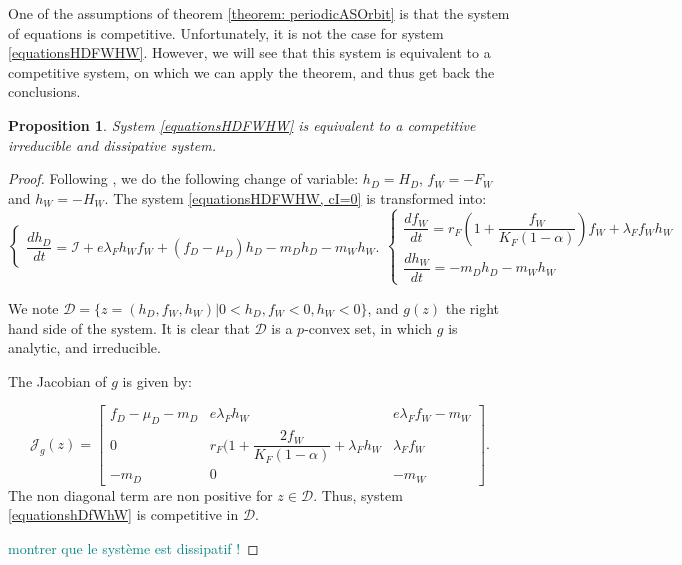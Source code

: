 \documentclass{article}
\newcommand{\lfw}{\lambda_{F}}
\newcommand{\lfw}{\lambda_{F}}
\newcommand{\cI}{\mathcal{I}}
\newcommand{\marc}[1]{\textcolor{teal}{#1}}
\newtheorem{prop}{Proposition}
\begin{document}
One of the assumptions of theorem \eqref{theorem: periodicASOrbit} is that the system of equations is competitive. Unfortunately, it is not the case for system \eqref{equationsHDFWHW}. However, we will see that this system is equivalent to a competitive system, on which we can apply the theorem, and thus get back the conclusions.

\begin{prop}
System \eqref{equationsHDFWHW} is equivalent to a competitive irreducible and dissipative system.
\end{prop}

\begin{proof}
Following \cite{wang_predator-prey_1997}, we do the following change of variable: $h_D =  H_D$, $f_W = -F_W$ and $h_W = -H_W$.  The system \eqref{equationsHDFWHW, cI=0} is transformed into:
\begin{subequations}
\begin{equation}
\left\{ \begin{array}{l}
\dfrac{dh_D}{dt}= \cI + e\lfw h_W f_W + (f_D - \mu_D) h_D - m_D h_D - m_W h_W.
\end{array}\right.
\end{equation}
\begin{equation}
\left\lbrace \begin{array}{l}
\dfrac{df_W}{dt} = r_F \left(1 + \dfrac{f_W}{K_F(1-\alpha)} \right) f_W + \lfw f_W h_W \\
\dfrac{dh_W}{dt}= -m_D h_D - m_W h_W 
\end{array} \right.
\end{equation}
\label{equationshDfWhW}
\end{subequations}

We note $\mathcal{D} = \Big\{z = (h_D, f_W, h_W) | 0 < h_D, f_W < 0, h_W < 0 \Big\}$, and $g(z)$ the right hand side of the system. It is clear that $\mathcal{D}$ is a $p$-convex set, in which $g$ is analytic, and irreducible.

The Jacobian of $g$ is given by:

\begin{equation*}
\mathcal{J}_g(z) = \begin{bmatrix}
f_D -\mu_D - m_D & e \lfw h_W & e \lfw f_W - m_W \\
0 & r_F \Big(1 + \dfrac{2 f_W}{K_F(1-\alpha)} + \lfw h_W & \lfw f_W \\
-m_D & 0 & -m_W
\end{bmatrix}.
\end{equation*}
The non diagonal term are non positive for $z \in \mathcal{D}$. Thus, system \eqref{equationshDfWhW} is competitive in $\mathcal{D}$.

\marc{montrer que le système est dissipatif !}


\end{proof}
\end{document}
